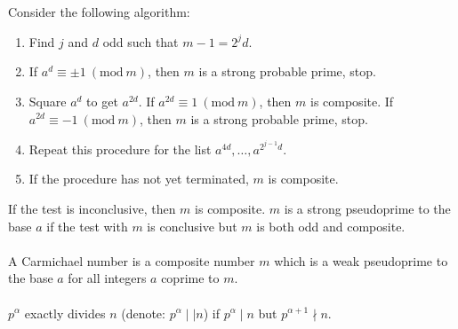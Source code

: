 \documentclass[12pt]{article}
\theoremstyle{definition}
\theoremstyle{named}
\newcommand{\Mod}[1]{\ (\mathrm{mod}\ #1)}
\begin{document}
\\
\\
Consider the following algorithm: \\
\begin{enumerate}
    \item Find $j$ and $d$ odd such that $m-1 = 2^jd$. 
    \item If $a^d \equiv \pm 1 \Mod{m}$, then $m$ is a strong probable prime, stop. 
    \item Square $a^d$ to get $a^{2d}$. If $a^{2d} \equiv 1 \Mod{m}$, then $m$ is composite. If $a^{2d} \equiv -1 \Mod{m}$, then $m$ is a strong probable prime, stop. 
    \item Repeat this procedure for the list $a^{4d}, \dots, a^{2^{j-1}d}$. 
    \item If the procedure has not yet terminated, $m$ is composite. 
\end{enumerate}
If the test is inconclusive, then $m$ is composite. $m$ is a strong pseudoprime to the base $a$ if the test with $m$ is conclusive but $m$ is both odd and composite. 
\\
\\
A Carmichael number is a composite number $m$ which is a weak pseudoprime to the base $a$ for all integers $a$ coprime to $m$. 
\\
\\
$p^\alpha$ exactly divides $n$ (denote: $p^\alpha \mid\mid n$) if $p^\alpha \mid n$ but $p^{\alpha + 1} \nmid n$. 
\end{document}
